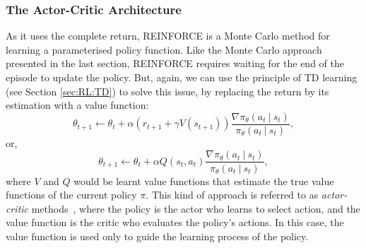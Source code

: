 \subsubsection{The Actor-Critic Architecture}\label{sec:Policy:Actor-Critic}
As it uses the complete return, REINFORCE is a Monte Carlo method for learning a parameterised policy function. Like the Monte Carlo approach presented in the last section, REINFORCE requires waiting for the end of the episode to update the policy. But, again, we can use the principle of TD learning (see Section \ref{sec:RL:TD}) to solve this issue, by replacing the return by its estimation with a value function:
\begin{equation}
    \theta_{t+1}\leftarrow\theta_t+\alpha\left(r_{t+1}+\gamma V(s_{t+1})\right)\frac{\nabla\pi_\theta(a_t\ |\ s_t)}{\pi_\theta(a_t\ |\ s_t)},
\end{equation}
or,
\begin{equation}
    \theta_{t+1}\leftarrow\theta_t+\alpha Q(s_t,a_t)\frac{\nabla\pi_\theta(a_t\ |\ s_t)}{\pi_\theta(a_t\ |\ s_t)},
\end{equation}
where $V$ and $Q$ would be learnt value functions that estimate the true value functions of the current policy $\pi$. This kind of approach is referred to as \textit{actor-critic} methods~\citep{Barto1983_ActorCritic, Sutton1984_ActorCritic}, where the policy is the actor who learns to select action, and the value function is the critic who evaluates the policy's actions. In this case, the value function is used only to guide the learning process of the policy. 

